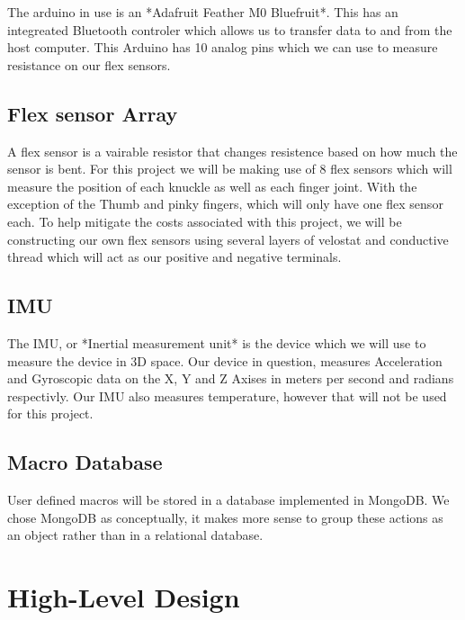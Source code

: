 \documentclass[12pt,a4paper,oneside]{book}
\theoremstyle{plain}
\numberwithin{equation}{chapter}
\begin{document}
\noindent The arduino in use is an *Adafruit Feather M0 Bluefruit*. This has an integreated Bluetooth controler which allows us to transfer data to and from the host computer. This Arduino has 10 analog pins which we can use to measure resistance on our flex sensors.

\section{Flex sensor Array}

\noindent A flex sensor is a vairable resistor that changes resistence based on how much the sensor is bent. For this project we will be making use of 8 flex sensors which will measure the position of each knuckle as well as each finger joint. With the exception of the Thumb and pinky fingers, which will only have one flex sensor each. To help mitigate the costs associated with this project, we will be constructing our own flex sensors using several layers of velostat and conductive thread which will act as our positive and negative terminals.

\section{IMU}

\noindent The IMU, or *Inertial measurement unit* is the device which we will use to measure the device in 3D space. Our device in question, measures Acceleration and Gyroscopic data on the X, Y and Z Axises in meters per second and radians respectivly. Our IMU also measures temperature, however that will not be used for this project.

\section{Macro Database}

\noindent User defined macros will be stored in a database implemented in MongoDB. We chose MongoDB as conceptually, it makes more sense to group these actions as an object rather than in a relational database.

\chapter*{High-Level Design}
\end{document}
